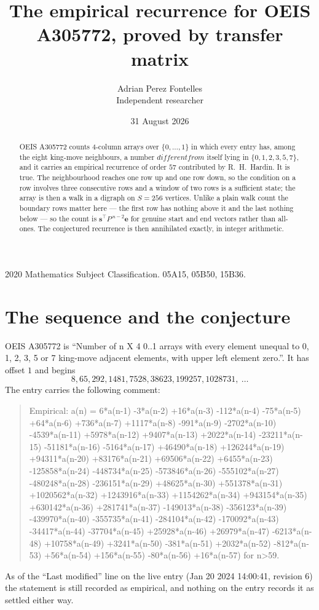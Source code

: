 \documentclass[11pt,a4paper]{article}
\title{The empirical recurrence for OEIS A305772, proved by transfer matrix}
\author{Adrian Perez Fontelles\\ \small Independent researcher}
\date{31 August 2026}
\theoremstyle{plain}
\theoremstyle{definition}
\begin{document}
\maketitle

\begin{abstract}
OEIS A305772 counts $4$-column arrays over $\{0,\dots,1\}$ in which every entry has,
among the eight king-move neighbours, a number $different from$ itself lying in $\{0,1,2,3,5,7\}$, and it carries an empirical
recurrence of order $57$ contributed by R.~H.~Hardin. It is true. The neighbourhood
reaches one row up and one row down, so the condition on a row involves three consecutive
rows and a window of two rows is a sufficient state; the array is then a walk in a digraph
on $S=256$ vertices. Unlike a plain walk count the boundary rows matter here --- the first
row has nothing above it and the last nothing below --- so the count is
$\mathbf{s}^{\!\top}P^{\,n-2}\mathbf{e}$ for genuine start and end vectors rather than
all-ones. The conjectured recurrence is then annihilated exactly, in integer arithmetic.
\end{abstract}

\noindent\small 2020 Mathematics Subject Classification. 05A15, 05B50, 15B36.\normalsize

\section{The sequence and the conjecture}

OEIS A305772 is ``Number of n X 4 0..1 arrays with every element unequal to 0, 1, 2, 3, 5 or 7 king-move adjacent elements, with upper left element zero.''. It has offset
$1$ and begins
\[
8, 65, 292, 1481, 7528, 38623, 199257, 1028731,\ \dots
\]
The entry carries the following comment:
\begin{quote}\small
Empirical: a(n) = 6*a(n-1) -3*a(n-2) +16*a(n-3) -112*a(n-4) -75*a(n-5) +64*a(n-6) +736*a(n-7) +1117*a(n-8) -991*a(n-9) -2702*a(n-10) -4539*a(n-11) +5978*a(n-12) +9407*a(n-13) +2022*a(n-14) -23211*a(n-15) -51181*a(n-16) -5164*a(n-17) +46490*a(n-18) +126244*a(n-19) +94311*a(n-20) +83176*a(n-21) +69506*a(n-22) +6455*a(n-23) -125858*a(n-24) -448734*a(n-25) -573846*a(n-26) -555102*a(n-27) -480248*a(n-28) -236151*a(n-29) +48625*a(n-30) +551378*a(n-31) +1020562*a(n-32) +1243916*a(n-33) +1154262*a(n-34) +943154*a(n-35) +630142*a(n-36) +281741*a(n-37) -149013*a(n-38) -356123*a(n-39) -439970*a(n-40) -355735*a(n-41) -284104*a(n-42) -170092*a(n-43) -34417*a(n-44) -37704*a(n-45) +25928*a(n-46) +26979*a(n-47) -6213*a(n-48) +10758*a(n-49) +3241*a(n-50) -381*a(n-51) +2032*a(n-52) -812*a(n-53) +56*a(n-54) +156*a(n-55) -80*a(n-56) +16*a(n-57) for n>59.
\end{quote}
As of the ``Last modified'' line on the live entry (Jan 20 2024 14:00:41, revision
6) the statement is still recorded as empirical, and nothing on the entry
records it as settled either way.
\end{document}
